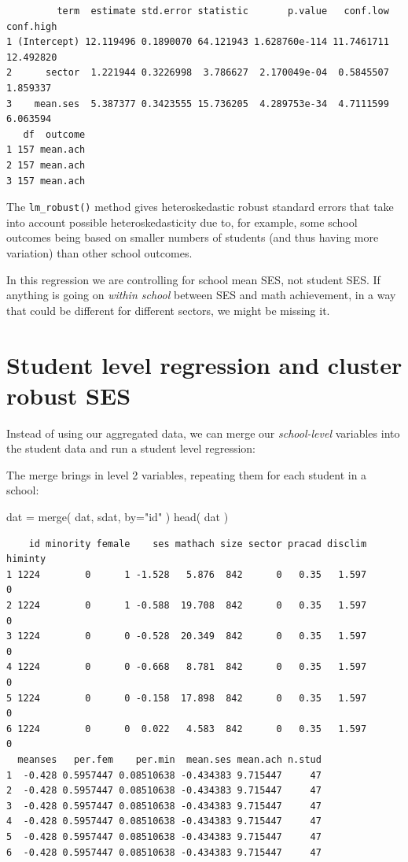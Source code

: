 \documentclass[
  letterpaper,
  DIV=11,
  numbers=noendperiod]{scrreprt}
\newenvironment{Shaded}{\begin{snugshade}}{\end{snugshade}}
\newcommand{\AttributeTok}[1]{\textcolor[rgb]{0.49,0.56,0.16}{#1}}
\newcommand{\FunctionTok}[1]{\textcolor[rgb]{0.02,0.16,0.49}{#1}}
\newcommand{\NormalTok}[1]{\textcolor[rgb]{0.00,0.44,0.13}{#1}}
\newcommand{\OtherTok}[1]{\textcolor[rgb]{0.00,0.44,0.13}{#1}}
\newcommand{\StringTok}[1]{\textcolor[rgb]{0.25,0.44,0.63}{#1}}
\begin{document}
\begin{verbatim}
         term  estimate std.error statistic       p.value   conf.low conf.high
1 (Intercept) 12.119496 0.1890070 64.121943 1.628760e-114 11.7461711 12.492820
2      sector  1.221944 0.3226998  3.786627  2.170049e-04  0.5845507  1.859337
3    mean.ses  5.387377 0.3423555 15.736205  4.289753e-34  4.7111599  6.063594
   df  outcome
1 157 mean.ach
2 157 mean.ach
3 157 mean.ach
\end{verbatim}

The \texttt{lm\_robust()} method gives heteroskedastic robust standard
errors that take into account possible heteroskedasticity due to, for
example, some school outcomes being based on smaller numbers of students
(and thus having more variation) than other school outcomes.

In this regression we are controlling for school mean SES, not student
SES. If anything is going on \emph{within school} between SES and math
achievement, in a way that could be different for different sectors, we
might be missing it.

\hypertarget{student-level-regression-and-cluster-robust-ses}{%
\section{Student level regression and cluster robust
SES}\label{student-level-regression-and-cluster-robust-ses}}

Instead of using our aggregated data, we can merge our
\emph{school-level} variables into the student data and run a student
level regression:

The merge brings in level 2 variables, repeating them for each student
in a school:

\begin{Shaded}
\begin{Highlighting}[]
\NormalTok{dat }\OtherTok{=} \FunctionTok{merge}\NormalTok{( dat, sdat, }\AttributeTok{by=}\StringTok{"id"}\NormalTok{ )}
\FunctionTok{head}\NormalTok{( dat )}
\end{Highlighting}
\end{Shaded}

\begin{verbatim}
    id minority female    ses mathach size sector pracad disclim himinty
1 1224        0      1 -1.528   5.876  842      0   0.35   1.597       0
2 1224        0      1 -0.588  19.708  842      0   0.35   1.597       0
3 1224        0      0 -0.528  20.349  842      0   0.35   1.597       0
4 1224        0      0 -0.668   8.781  842      0   0.35   1.597       0
5 1224        0      0 -0.158  17.898  842      0   0.35   1.597       0
6 1224        0      0  0.022   4.583  842      0   0.35   1.597       0
  meanses   per.fem    per.min  mean.ses mean.ach n.stud
1  -0.428 0.5957447 0.08510638 -0.434383 9.715447     47
2  -0.428 0.5957447 0.08510638 -0.434383 9.715447     47
3  -0.428 0.5957447 0.08510638 -0.434383 9.715447     47
4  -0.428 0.5957447 0.08510638 -0.434383 9.715447     47
5  -0.428 0.5957447 0.08510638 -0.434383 9.715447     47
6  -0.428 0.5957447 0.08510638 -0.434383 9.715447     47
\end{verbatim}
\end{document}
